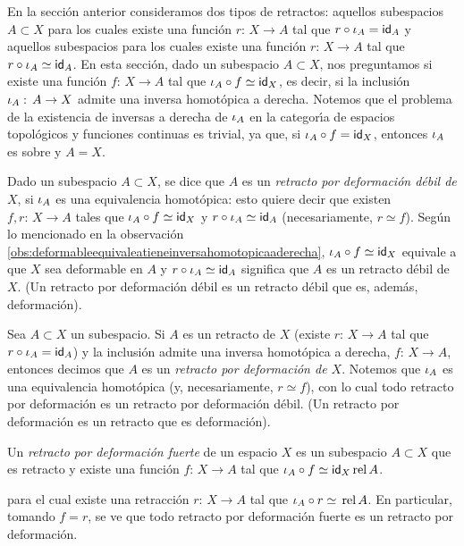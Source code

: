 En la secci\'{o}n anterior consideramos dos tipos de retractos: aquellos
subespacios $A\subset X$ para los cuales existe una funci\'{o}n
$r:\,X\rightarrow A$ tal que $r\circ\inc[A]=\id[A]$ y aquellos subespacios
para los cuales existe una funci\'{o}n $r:\,X\rightarrow A$ tal que
$r\circ\inc[A]\simeq\id[A]$. En esta secci\'{o}n, dado un subespacio
$A\subset X$, nos preguntamos si existe una funci\'{o}n $f:\,X\rightarrow A$
tal que $\inc[A]\circ f\simeq\id[X]$, es decir, si la inclusi\'{o}n
$\inc[A]:\,A\rightarrow X$ admite una inversa homot\'{o}pica a derecha.
Notemos que el problema de la existencia de inversas a derecha de $\inc[A]$ en
la categor\'{\i}a de espacios topol\'{o}gicos y funciones continuas es trivial,
ya que, si $\inc[A]\circ f=\id[X]$, entonces $\inc[A]$ es sobre y $A=X$.

Dado un subespacio $A\subset X$, se dice que $A$ es un \emph{retracto por %
deformaci\'{o}n d\'{e}bil de $X$}, si $\inc[A]$ es una equivalencia
homot\'{o}pica: esto quiere decir que existen $f,r:\,X\rightarrow A$ tales que
$\inc[A]\circ f\simeq\id[X]$ y $r\circ\inc[A]\simeq\id[A]$ (necesariamente,
$r\simeq f$). Seg\'{u}n lo mencionado en la observaci\'{o}n
\ref{obs:deformableequivaleatieneinversahomotopicaaderecha},
$\inc[A]\circ f\simeq\id[X]$ equivale a que $X$ sea deformable en $A$ y
$r\circ\inc[A]\simeq\id[A]$ significa que $A$ es un retracto d\'{e}bil de $X$.
(Un retracto por deformaci\'{o}n d\'{e}bil es un retracto d\'{e}bil que es,
adem\'{a}s, deformaci\'{o}n).

Sea $A\subset X$ un subespacio. Si $A$ es un retracto de $X$ (existe
$r:\,X\rightarrow A$ tal que $r\circ\inc[A]=\id[A]$) y la inclusi\'{o}n
admite una inversa homot\'{o}pica a derecha, $f:\,X\rightarrow A$, entonces
decimos que $A$ es un \emph{retracto por deformaci\'{o}n de $X$}. Notemos que
$\inc[A]$ es una equivalencia homot\'{o}pica (y, necesariamente, $r\simeq f$),
con lo cual todo retracto por deformaci\'{o}n es un retracto por
deformaci\'{o}n d\'{e}bil. (Un retracto por deformaci\'{o}n es un retracto que
es deformaci\'{o}n).

Un \emph{retracto por deformaci\'{o}n fuerte} de un espacio $X$ es un
subespacio $A\subset X$ que es retracto y existe una funci\'{o}n
$f:\,X\rightarrow A$ tal que $\inc[A]\circ f\simeq\id[X]\,\rel{A}$.

para el cual existe una retracci\'{o}n
$r:\,X\rightarrow A$ tal que $\inc[A]\circ r \simeq\,\rel{A}$. En particular,
tomando $f=r$, se ve que todo retracto por deformaci\'{o}n fuerte es un
retracto por deformaci\'{o}n.


